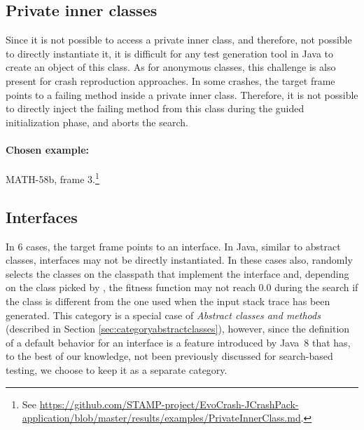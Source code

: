\subsection{Private inner classes}

Since it is not possible to access a private inner class, and therefore, not possible to directly instantiate it, it is difficult for any test generation tool in Java to create an object of this class.
As for anonymous classes, this challenge is also present for crash reproduction approaches.
In some crashes, the target frame points to a failing method inside a private inner class.
Therefore, it is not possible to directly inject the failing method from this class during the guided initialization phase, and \evocrash aborts the search.

\paragraph{Chosen example:} 
MATH-58b, frame 3.\footnote{See \url{https://github.com/STAMP-project/EvoCrash-JCrashPack-application/blob/master/results/examples/PrivateInnerClass.md}.}





\subsection{Interfaces}

In 6 cases, the target frame points to an interface.
In Java, similar to abstract classes, interfaces may not be directly instantiated.
In these cases also, \evocrash randomly selects the classes on the classpath that implement the interface and, depending on the class picked by \evocrash, the fitness function may  not reach $0.0$ during the search if the class is different from the one used when the input stack trace has been generated.
%
This category is a special case of \emph{Abstract classes and methods} (described in Section \ref{sec:categoryabstractclasses}), however, since the definition of a default behavior for an interface is a feature introduced by Java~8 \cite{jdk8release} that has, to the best of our knowledge, not been previously discussed for search-based testing, we choose to keep it as a separate category. 

